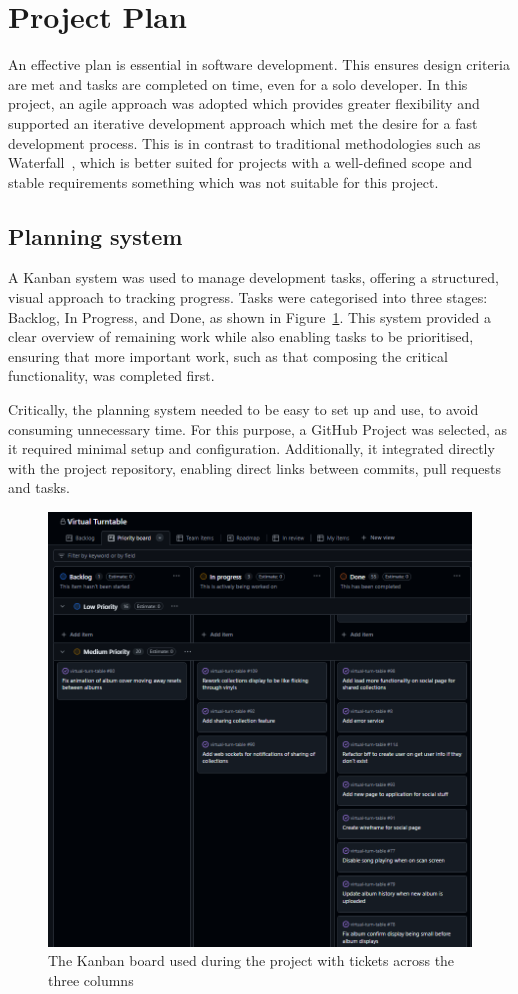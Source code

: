 \section{Project Plan}
An effective plan is essential in software development. This ensures design criteria are met and tasks are completed on time, even for a solo developer. In this project, an agile approach was adopted which provides greater flexibility and supported an iterative development approach which met the desire for a fast development process. This is in contrast to traditional methodologies such as Waterfall~\cite{5222784}, which is better suited for projects with a well-defined scope and stable requirements something which was not suitable for this project.

\subsection{Planning system} \label{sec:plan-system}
A Kanban system was used to manage development tasks, offering a structured, visual approach to tracking progress. Tasks were categorised into three stages: Backlog, In Progress, and Done, as shown in Figure~\ref{fig:kanban-board}. This system provided a clear overview of remaining work while also enabling tasks to be prioritised, ensuring that more important work, such as that composing the critical functionality, was completed first.

Critically, the planning system needed to be easy to set up and use, to avoid consuming unnecessary time. For this purpose, a GitHub Project was selected, as it required minimal setup and configuration. Additionally, it integrated directly with the project repository, enabling direct links between commits, pull requests and tasks.

\begin{figure}
    \centering
    \includegraphics[width=0.65\linewidth]{figures/kanban_board.png}
    \captionsetup{justification=centering,margin=2cm}
    \caption{The Kanban board used during the project with tickets across the three columns}
    \label{fig:kanban-board}
\end{figure}

